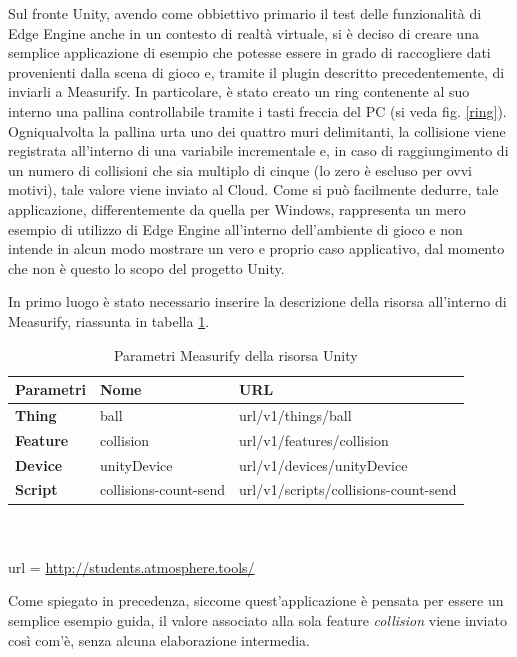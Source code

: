 Sul fronte Unity, avendo come obbiettivo primario il test delle funzionalità di Edge Engine anche in un contesto di realtà virtuale, si è deciso di creare una semplice applicazione di esempio che potesse essere in grado di raccogliere dati provenienti dalla scena di gioco e, tramite il plugin descritto precedentemente, di inviarli a Measurify. In particolare, è stato creato un ring contenente al suo interno una pallina controllabile tramite i tasti freccia del PC (si veda fig. \ref{ring}). Ogniqualvolta la pallina urta uno dei quattro muri delimitanti, la collisione viene registrata all'interno di una variabile incrementale e, in caso di raggiungimento di un numero di collisioni che sia multiplo di cinque (lo zero è escluso per ovvi motivi), tale valore viene inviato al Cloud. Come si può facilmente dedurre, tale applicazione, differentemente da quella per Windows, rappresenta un mero esempio di utilizzo di Edge Engine all'interno dell'ambiente di gioco e non intende in alcun modo mostrare un vero e proprio caso applicativo, dal momento che non è questo lo scopo del progetto Unity.

In primo luogo è stato necessario inserire la descrizione della risorsa all'interno di Measurify, riassunta in tabella \ref{descunitydev}.

\begin{table}[H]
	\begin{tabular}{|p{}|p{}|p{}|}
		\hline
		\textbf{Parametri} & \textbf{Nome} & \textbf{URL}\\
		\hline
		\textbf{Thing} & ball & {{url}}/v1/things/ball\\
		\hline
		\textbf{Feature} & collision & {{url}}/v1/features/collision\\
		\hline
		\textbf{Device} & unityDevice & {{url}}/v1/devices/unityDevice\\	
		\hline
		\textbf{Script} & collisions-count-send & {{url}}/v1/scripts/collisions-count-send\\	
		\hline
	\end{tabular}
	\\\\url = \url{http://students.atmosphere.tools/}
	\caption{Parametri Measurify della risorsa Unity}
	\label{descunitydev}
\end{table}

Come spiegato in precedenza, siccome quest'applicazione è pensata per essere un semplice esempio guida, il valore associato alla sola feature \textit{collision} viene inviato così com'è, senza alcuna elaborazione intermedia.

